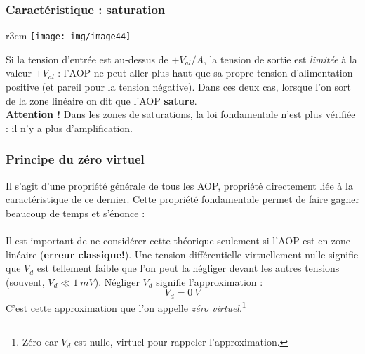 \subsubsection{Caractéristique : saturation}
\begin{wrapfigure}[8]{r}{3cm}
	\texttt{[image: img/image44]}
\end{wrapfigure}
Si la tension d'entrée est au-dessus de $+V_{al}/A$, la tension de sortie est \textit{limitée} à la valeur $+V_{al}$ : l'AOP ne peut aller plus haut que sa propre tension d'alimentation positive (et pareil pour la tension négative). Dans ces deux cas, lorsque l'on sort de la zone linéaire on dit que l'AOP \textbf{sature}.\\
\textbf{Attention !} Dans les zones de saturations, la loi fondamentale n'est plus vérifiée : il n'y a plus d'amplification.




\subsubsection{Principe du zéro virtuel}
Il s'agit d'une propriété générale de tous les AOP, propriété directement liée à la caractéristique de ce dernier. Cette propriété fondamentale permet de faire gagner beaucoup de temps et s'énonce :\\

\ \\

Il est important de ne considérer cette théorique seulement si l'AOP est en zone linéaire (\textbf{erreur classique!}). Une tension différentielle virtuellement nulle signifie que $V_d$ est tellement faible que l'on peut la négliger devant les autres tensions (souvent, $V_d \ll 1\ mV$). Négliger $V_d$ signifie l'approximation :
\begin{equation}
	V_d = 0\ V
\end{equation}
C'est cette approximation que l'on appelle \textit{zéro virtuel}.\footnote{Zéro car $V_d$ est nulle, virtuel pour rappeler l'approximation.}


